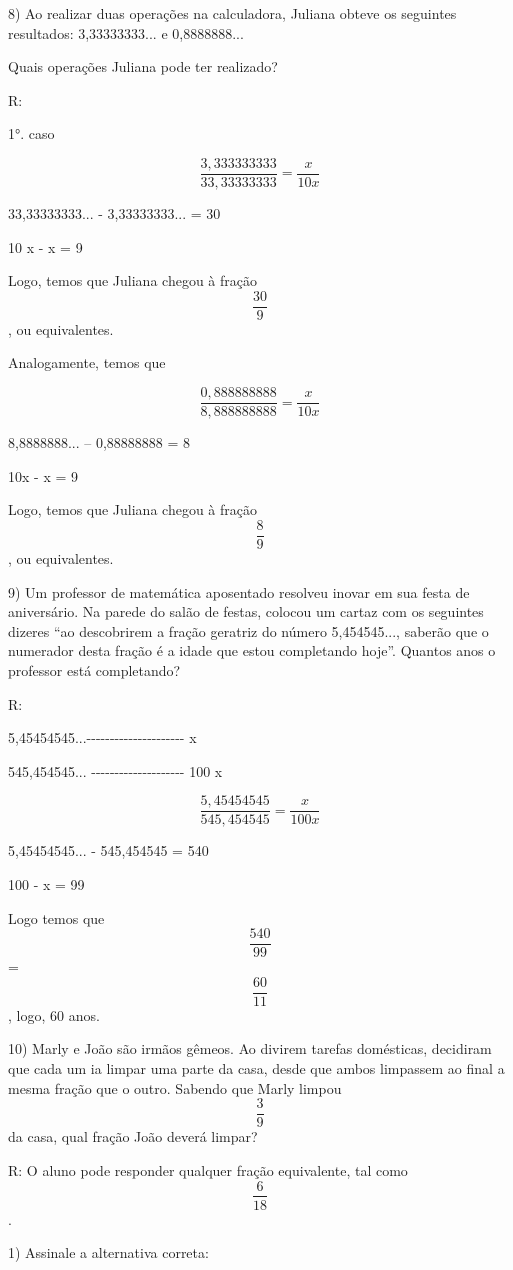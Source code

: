 8) Ao realizar duas operações na calculadora, Juliana obteve os
seguintes resultados: 3,33333333... e 0,8888888...

Quais operações Juliana pode ter realizado?

R:

1°. caso

\[\frac {3,333333333}{33,33333333} = \frac {x}{10x}\]

33,33333333... - 3,33333333... = 30

10 x - x = 9

Logo, temos que Juliana chegou à fração \[\frac{30}{9}\], ou
equivalentes.

Analogamente, temos que

\[\frac {0,888888888}{8,888888888} = \frac {x}{10x}\]

8,8888888... -- 0,88888888 = 8

10x - x = 9

Logo, temos que Juliana chegou à fração \[\frac{8}{9}\], ou
equivalentes.

9) Um professor de matemática aposentado resolveu inovar em sua festa de
aniversário. Na parede do salão de festas, colocou um cartaz com os
seguintes dizeres ``ao descobrirem a fração geratriz do número
5,454545..., saberão que o numerador desta fração é a idade que estou
completando hoje''. Quantos anos o professor está completando?

R:

5,45454545...-\/-\/-\/-\/-\/-\/-\/-\/-\/-\/-\/-\/-\/-\/-\/-\/-\/-\/-\/-\/-
x

545,454545... -\/-\/-\/-\/-\/-\/-\/-\/-\/-\/-\/-\/-\/-\/-\/-\/-\/-\/-\/-
100 x

\[\frac {5,45454545}{545,454545} = \frac {x}{100x}\]

5,45454545... - 545,454545 = 540

100 - x = 99

Logo temos que \[\frac{540}{99}\] = \[\frac{60}{11}\], logo, 60 anos.

10) Marly e João são irmãos gêmeos. Ao divirem tarefas domésticas,
decidiram que cada um ia limpar uma parte da casa, desde que ambos
limpassem ao final a mesma fração que o outro. Sabendo que Marly limpou
\[\frac{3}{9}\] da casa, qual fração João deverá limpar?

R: O aluno pode responder qualquer fração equivalente, tal como
\[\frac{6}{18}\].


1) Assinale a alternativa correta:

